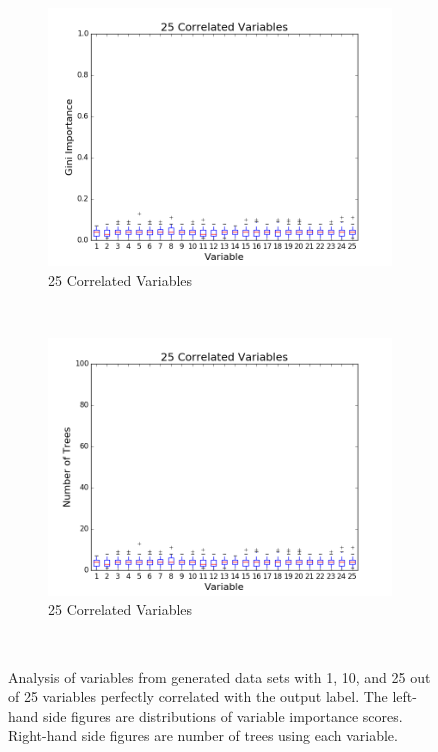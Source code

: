 \begin{figure}[H]
\begin{subfigure}[b]{0.45\textwidth}
    \includegraphics[width=\textwidth]{figures/random_forests/rf_correlated_1_0_25.png}
    \caption{25 Correlated Variables}
    \label{fig:corr-1-25}
  \end{subfigure}
  ~
  \begin{subfigure}[b]{0.45\textwidth}
    \includegraphics[width=\textwidth]{figures/random_forests/rf_correlated_1_0_25_feature_counts.png}
    \caption{25 Correlated Variables}
    \label{fig:corr-1-25-counts}
  \end{subfigure}
  ~
  \caption{Analysis of variables from generated data sets with 1, 10, and 25 out of 25 variables perfectly correlated with the output label. The left-hand side figures are distributions of variable importance scores. Right-hand side figures are number of trees using each variable.}
  \label{fig:corr-1}
\end{figure}

